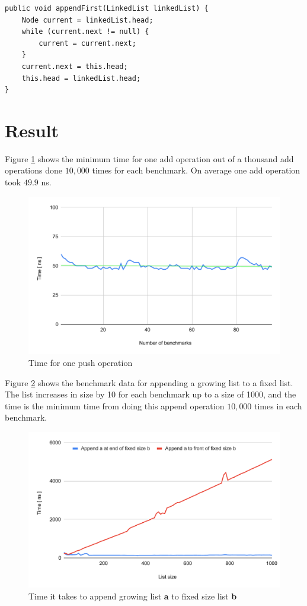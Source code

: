 \documentclass[a4paper,11pt]{article}
\newenvironment{code}{\captionsetup{type=listing}}{}
\begin{document}
\begin{code}
\label{code:append}
\begin{verbatim}
public void appendFirst(LinkedList linkedList) {
    Node current = linkedList.head;
    while (current.next != null) {
        current = current.next;
    }
    current.next = this.head;
    this.head = linkedList.head;
}
\end{verbatim}
\end{code}

\FloatBarrier
\section*{Result}
Figure \ref{fig:addOperation} shows the minimum time for one add operation out of a thousand add operations done $10,000$ 
times for each benchmark. On average one add operation took $49.9$ ns.

\begin{figure}[h]
    \centering
    \includegraphics[width=.8\textwidth]{addOperation.pdf}
    \caption{Time for one push operation}
    \label{fig:addOperation}
\end{figure}

Figure \ref{fig:listAppend} shows the benchmark data for appending a growing list to a fixed list. The list increases in size by 
10 for each benchmark up to a size of 1000, and the time is the minimum time from doing this append operation $10,000$ times in 
each benchmark.

\begin{figure}[h]
    \centering
    \includegraphics[width=.8\textwidth]{appendList.pdf}
    \caption{Time it takes to append growing list \textbf{a} to fixed size list \textbf{b}}
    \label{fig:listAppend}
\end{figure}
\end{document}
